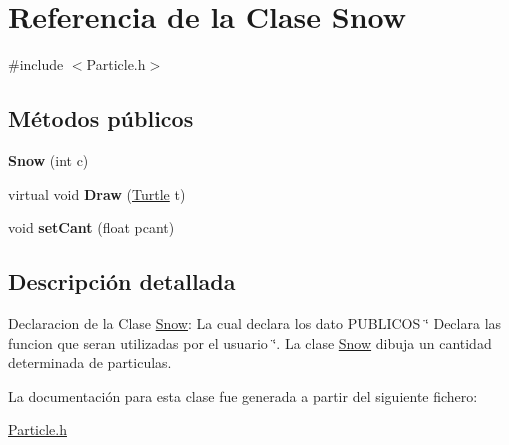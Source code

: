 \hypertarget{class_snow}{}\section{Referencia de la Clase Snow}
\label{class_snow}


{\ttfamily \#include $<$Particle.\+h$>$}

\subsection*{Métodos públicos}
\begin{DoxyCompactItemize}
\item 
\mbox{\label{class_snow_ac696d06b015958c09d5fbb13d02bf8b6}} 
{\bfseries Snow} (int c)
\item 
\mbox{\label{class_snow_a4c8865c8e6ad4db203332acc90b65e85}} 
virtual void {\bfseries Draw} (\mbox{\hyperlink{class_turtle}{Turtle}} t)
\item 
\mbox{\label{class_snow_a6f548af958d4f69411ec04fa16b2dc70}} 
void {\bfseries set\+Cant} (float pcant)
\end{DoxyCompactItemize}


\subsection{Descripción detallada}
Declaracion de la Clase \mbox{\hyperlink{class_snow}{Snow}}\+: La cual declara los dato P\+U\+B\+L\+I\+C\+OS \char`\"{} Declara las funcion que seran utilizadas por el usuario \char`\"{}. La clase \mbox{\hyperlink{class_snow}{Snow}} dibuja un cantidad determinada de particulas. 

La documentación para esta clase fue generada a partir del siguiente fichero\+:\begin{DoxyCompactItemize}
\item 
\mbox{\hyperlink{_particle_8h}{Particle.\+h}}\end{DoxyCompactItemize}
